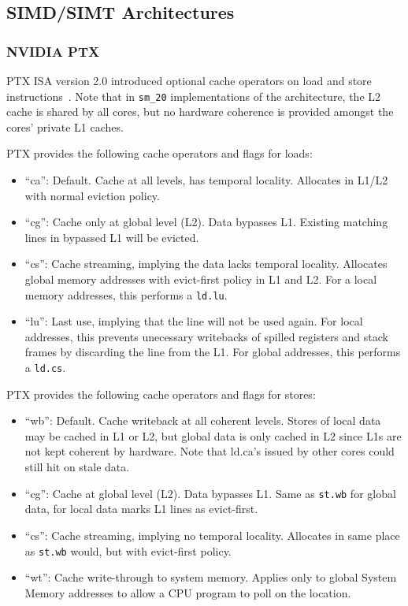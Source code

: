 \subsection{SIMD/SIMT Architectures}

\subsubsection{NVIDIA PTX}

PTX ISA version 2.0 introduced optional cache operators on load and store instructions~\cite{ptx2}.
Note that in \verb=sm_20= implementations of the architecture, the L2 cache is shared by all cores,
but no hardware coherence is provided amongst the cores' private L1 caches.

PTX provides the following cache operators and flags for loads:
\begin{itemize}
\item ``ca'':  Default. Cache at all levels, has temporal locality. Allocates in L1/L2 with normal eviction policy.
\item ``cg'': Cache only at global level (L2). Data bypasses L1. Existing matching lines in bypassed L1 will be evicted.
\item ``cs'': Cache streaming, implying the data lacks temporal locality. Allocates global memory addresses with evict-first policy in L1 and L2. For a local memory addresses, this performs a \verb=ld.lu=.
\item ``lu'': Last use, implying that the line will not be used again. For local addresses, this prevents unecessary writebacks of spilled registers and stack frames by discarding the line from the L1. For global addresses, this performs a \verb=ld.cs=.
\end{itemize}

PTX provides the following cache operators and flags for stores:
\begin{itemize}
\item ``wb'': Default. Cache writeback at all coherent levels. Stores of local data may be cached in L1 or L2, but global data is only cached in L2 since L1s are not kept coherent by hardware. Note that ld.ca's issued by other cores could still hit on stale data.
\item ``cg'': Cache at global level (L2). Data bypasses L1. Same as \verb=st.wb= for global data, for local data marks L1 lines as evict-first.
\item ``cs'': Cache streaming, implying no temporal locality. Allocates in same place as \verb=st.wb= would, but with evict-first policy.
\item ``wt'': Cache write-through to system memory. Applies only to global System Memory addresses to allow a CPU program to poll on the location.
\end{itemize}

